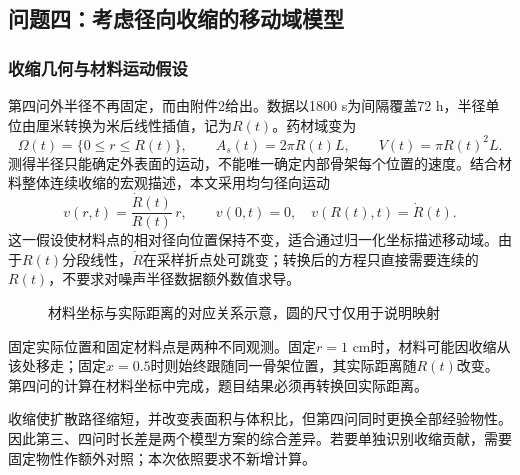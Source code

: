 \subsection{问题四：考虑径向收缩的移动域模型}
\subsubsection{收缩几何与材料运动假设}
第四问外半径不再固定，而由附件2给出。数据以1800 s为间隔覆盖72 h，半径单位由厘米转换为米后线性插值，记为$R(t)$。药材域变为
\begin{equation}
\Omega(t)=\{0\le r\le R(t)\},\qquad
A_s(t)=2\pi R(t)L,\qquad V(t)=\pi R(t)^2L .
\end{equation}
测得半径只能确定外表面的运动，不能唯一确定内部骨架每个位置的速度。结合材料整体连续收缩的宏观描述\cite{mayor}，本文采用均匀径向运动
\begin{equation}
v(r,t)=\frac{\dot R(t)}{R(t)}\,r,\qquad
v(0,t)=0,\quad v(R(t),t)=\dot R(t).
\label{eq:velocity}
\end{equation}
这一假设使材料点的相对径向位置保持不变，适合通过归一化坐标描述移动域。由于$R(t)$分段线性，$\dot R$在采样折点处可跳变；转换后的方程只直接需要连续的$R(t)$，不要求对噪声半径数据额外数值求导。

\begin{figure}[H]\centering
{}
\caption{材料坐标与实际距离的对应关系示意，圆的尺寸仅用于说明映射}\label{fig:shrinkmap}
\end{figure}

固定实际位置和固定材料点是两种不同观测。固定$r=1$ cm时，材料可能因收缩从该处移走；固定$x=0.5$时则始终跟随同一骨架位置，其实际距离随$R(t)$改变。第四问的计算在材料坐标中完成，题目结果必须再转换回实际距离。

收缩使扩散路径缩短，并改变表面积与体积比，但第四问同时更换全部经验物性。因此第三、四问时长差是两个模型方案的综合差异。若要单独识别收缩贡献，需要固定物性作额外对照；本次依照要求不新增计算。

